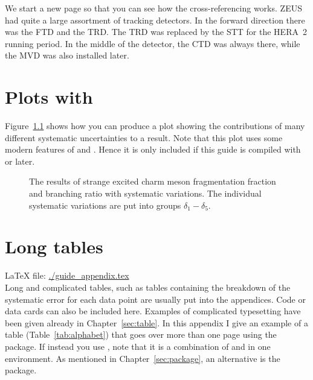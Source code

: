 We start a new page so that you can see how the cross-referencing
works.  ZEUS had quite a large assortment of tracking detectors. In the
forward direction there was the \gls{FTD} and the \gls{TRD}. The
\gls{TRD} was replaced by the \gls{STT} for the HERA~2 running
period.  In the middle of the detector, the \gls{CTD} was always
there, while the \gls{MVD} was also installed later.


\chapter{Plots with }
\label{sec:app:tikz}

Figure~\ref{fig:tikz:syst} shows how you can produce a plot showing
the contributions of many different systematic uncertainties to a
result. Note that this plot uses some modern features of
 and . Hence it is only included if
this guide is compiled with  or later.


\begin{figure}[htbp]
  \centering
   {%
  }{%
    
  }
  \caption[Strange $D^{**}$ systematics, fragmentation fractions]{The
    results of strange excited charm meson fragmentation fraction and
    branching ratio with systematic variations.  The individual
    systematic variations are put into groups $\delta_1-\delta_5$.}
  \label{fig:tikz:syst}
\end{figure}


\chapter{Long tables}
\label{sec:app:tables}

\LaTeX{} file: \url{./guide_appendix.tex}\\[1ex]
\noindent
Long and complicated tables, such as tables containing the breakdown
of the systematic error for each data point are usually put into the
appendices. Code or data cards can also be included here.  Examples of
complicated typesetting have been given already in
Chapter~\ref{sec:table}. In this appendix I give an example of a table
(Table~\ref{tab:alphabet}) that goes over more than one page using the
 package. If instead you use ,
note that it is a
combination of  and  in one
environment. 
As mentioned in Chapter~\ref{sec:package}, an alternative
is the  package.
 
